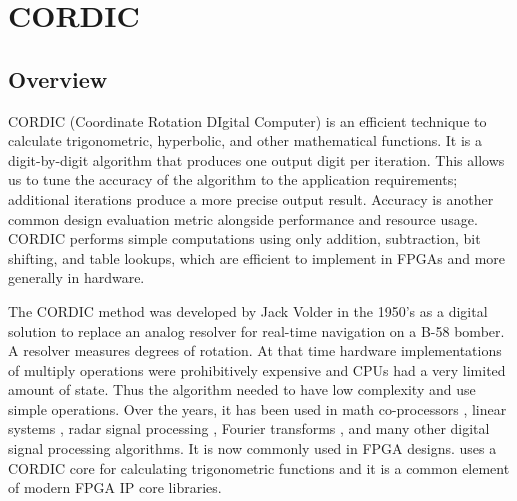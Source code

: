 
\chapter{CORDIC}
\glsresetall
\label{chapter:cordic}

\section{Overview}
\label{subsec:CORDIC_Overview}


CORDIC (Coordinate Rotation DIgital Computer) is an efficient technique to calculate trigonometric, hyperbolic, and other mathematical functions. It is a digit-by-digit algorithm that produces one output digit per iteration. This allows us to tune the accuracy of the algorithm to the application requirements; additional iterations produce a more precise output result. Accuracy is another common design evaluation metric alongside performance and resource usage. CORDIC performs simple computations using only addition, subtraction, bit shifting, and table lookups, which are efficient to implement in FPGAs and more generally in hardware. 

\begin{aside}
The CORDIC method was developed by Jack Volder in the 1950's as a digital solution to replace an analog resolver for real-time navigation on a B-58 bomber. A resolver measures degrees of rotation. At that time hardware implementations of multiply operations were prohibitively expensive and CPUs had a very limited amount of state. Thus the algorithm needed to have low complexity and use simple operations.  Over the years, it has been used in math co-processors \cite{duprat1993cordic}, linear systems \cite{ahmed1982highly}, radar signal processing \cite{andraka1996building}, Fourier transforms \cite{despain1974fourier}, and many other digital signal processing algorithms. It is now commonly used in FPGA designs. \VHLS uses a CORDIC core for calculating trigonometric functions and it is a common element of modern FPGA IP core libraries.
\end{aside}

